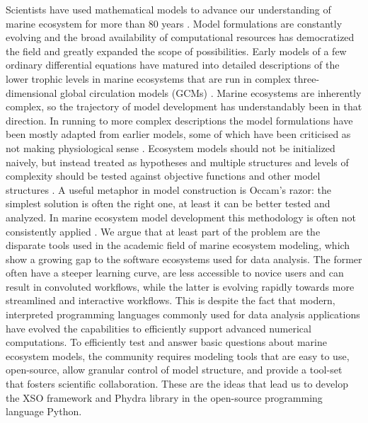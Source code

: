\documentclass[journal abbreviation, manuscript]{copernicus}
\begin{document}
Scientists have used mathematical models to advance our understanding of marine ecosystem for more than 80 years \citep{Gentleman2002a}. Model formulations are constantly evolving and the broad availability of computational resources has democratized the field and greatly expanded the scope of possibilities.
Early models of a few ordinary differential equations have matured into detailed descriptions of the lower trophic levels in marine ecosystems that are run in complex three-dimensional global circulation models (GCMs) \citep[e.g.][]{Dutkiewicz2020DimensionsDiversity}. 
Marine ecosystems are inherently complex, so the trajectory of model development has understandably been in that direction. In running to more complex descriptions the model formulations have been mostly adapted from earlier models, some of which have been criticised as not making physiological sense \citep{Smith2014}. Ecosystem models should not be initialized naively, but instead treated as hypotheses and multiple structures and levels of complexity should be tested against objective functions and other model structures \citep{Franks2009}. A useful metaphor in model construction is Occam's razor: the simplest solution is often the right one, at least it can be better tested and analyzed. In marine ecosystem model development this methodology is often not consistently applied \citep{Shimoda2016}.
We argue that at least part of the problem are the disparate tools used in the academic field of marine ecosystem modeling, which show a growing gap to the software ecosystems used for data analysis. 
The former often have a steeper learning curve, are less accessible to novice users and can result in convoluted workflows, while the latter is evolving rapidly towards more streamlined and interactive workflows. This is despite the fact that modern, interpreted programming languages commonly used for data analysis applications have evolved the capabilities to efficiently support advanced numerical computations.
To efficiently test and answer basic questions about marine ecosystem models, the community requires modeling tools that are easy to use, open-source, allow granular control of model structure, and provide a tool-set that fosters scientific collaboration. These are the ideas that lead us to develop the XSO framework and Phydra library in the open-source programming language Python.
\end{document}
